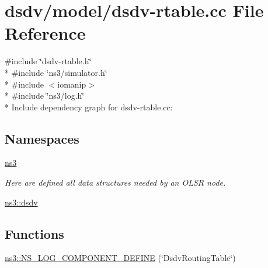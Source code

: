 \hypertarget{dsdv-rtable_8cc}{}\section{dsdv/model/dsdv-\/rtable.cc File Reference}
\label{dsdv-rtable_8cc}
{\ttfamily \#include \char`\"{}dsdv-\/rtable.\+h\char`\"{}}\\*
{\ttfamily \#include \char`\"{}ns3/simulator.\+h\char`\"{}}\\*
{\ttfamily \#include $<$iomanip$>$}\\*
{\ttfamily \#include \char`\"{}ns3/log.\+h\char`\"{}}\\*
Include dependency graph for dsdv-\/rtable.cc\+:
\subsection*{Namespaces}
\begin{DoxyCompactItemize}
\item 
 \hyperlink{namespacens3}{ns3}
\begin{DoxyCompactList}\small\item\em Here are defined all data structures needed by an O\+L\+SR node. \end{DoxyCompactList}\item 
 \hyperlink{namespacens3_1_1dsdv}{ns3\+::dsdv}
\end{DoxyCompactItemize}
\subsection*{Functions}
\begin{DoxyCompactItemize}
\item 
\hyperlink{namespacens3_aadd95b2dddd113ef4a667d10a5042051}{ns3\+::\+N\+S\+\_\+\+L\+O\+G\+\_\+\+C\+O\+M\+P\+O\+N\+E\+N\+T\+\_\+\+D\+E\+F\+I\+NE} (\char`\"{}Dsdv\+Routing\+Table\char`\"{})
\end{DoxyCompactItemize}

